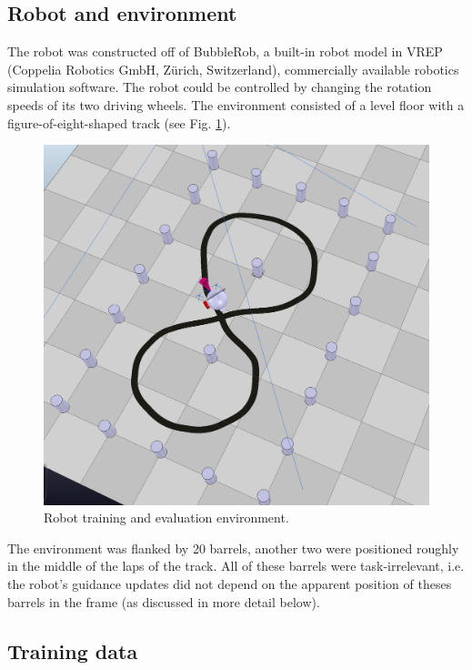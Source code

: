 \documentclass[11pt, oneside]{article}   	%
\begin{document}
\subsection{Robot and environment}
The robot was constructed off of BubbleRob, a built-in robot model in VREP (Coppelia Robotics GmbH, Zürich, Switzerland), commercially available robotics simulation software. The robot could be controlled by changing the rotation speeds of its two driving wheels. The environment consisted of a level floor with a figure-of-eight-shaped track (see Fig. \ref{fig:env}). 
\begin{figure}[h]
\includegraphics[width=\columnwidth]{Fig_1} 
\caption{Robot training and evaluation environment.}
\label{fig:env}
\end{figure}
The environment was flanked by 20 barrels, another two were positioned roughly in the middle of the laps of the track. All of these barrels were task-irrelevant, i.e. the robot's guidance updates did not depend on the apparent position of theses barrels in the frame (as discussed in more detail below).

\subsection{Training data}
\end{document}
